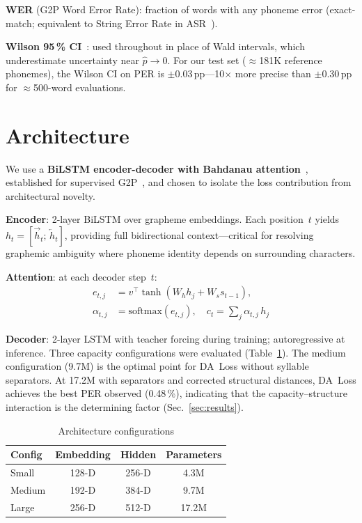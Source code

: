 \documentclass[conference]{IEEEtran}
\begin{document}
\textbf{WER} (G2P Word Error Rate): fraction of words with any
phoneme error (exact-match; equivalent to String Error Rate in
ASR~\cite{bisani2008joint}).

\textbf{Wilson 95\,\% CI}~\cite{wilson1927probable,brown2001interval}:
used throughout in place of Wald intervals, which underestimate
uncertainty near $\hat{p}\!\to\!0$.
For our test set ($\approx$181K reference phonemes), the Wilson CI on
PER is $\pm$0.03\,pp---10$\times$ more precise than
$\pm$0.30\,pp for $\approx$500-word evaluations.

\section{Architecture}

We use a \textbf{BiLSTM encoder-decoder with Bahdanau
attention}~\cite{bahdanau2014neural}, established for supervised
G2P~\cite{rao2015g2p}, and chosen to isolate the loss contribution
from architectural novelty.

\textbf{Encoder}: 2-layer BiLSTM over grapheme embeddings.
Each position~$t$ yields $h_t\!=\![\overrightarrow{h}_t;\,
\overleftarrow{h}_t]$, providing full bidirectional context---critical
for resolving graphemic ambiguity where phoneme identity depends on
surrounding characters.

\textbf{Attention}: at each decoder step~$t$:
\begin{align}
  e_{t,j} &= v^\top \tanh(W_h h_j + W_s s_{t-1}), \nonumber \\
  \alpha_{t,j} &= \mathrm{softmax}(e_{t,j}), \quad
  c_t = \textstyle\sum_j \alpha_{t,j}\, h_j
  \label{eq:attention}
\end{align}

\textbf{Decoder}: 2-layer LSTM with teacher forcing during training;
autoregressive at inference.
Three capacity configurations were evaluated
(Table~\ref{tab:configs}).
The medium configuration (9.7M) is the optimal point for DA~Loss
without syllable separators.
At 17.2M with separators and corrected structural distances,
DA~Loss achieves the best PER observed (0.48\,\%), indicating
that the capacity--structure interaction is the determining
factor (Sec.~\ref{sec:results}).

\begin{table}[t]
  \caption{Architecture configurations}
  \label{tab:configs}
  \centering\small
  \begin{tabular}{lccc}
    \toprule
    Config  & Embedding & Hidden & Parameters \\
    \midrule
    Small   & 128-D & 256-D & 4.3M \\
    Medium  & 192-D & 384-D & 9.7M \\
    Large   & 256-D & 512-D & 17.2M \\
    \bottomrule
  \end{tabular}
\end{table}
\end{document}
